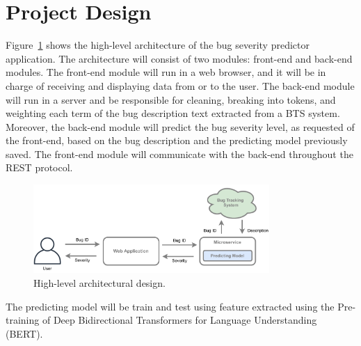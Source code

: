\documentclass[a4paper]{article}
\begin{document}
\section{Project Design}
Figure~\ref{fig:application-architecture} shows the high-level architecture of the bug severity predictor application. The architecture will consist of two modules: front-end and back-end modules. The front-end module will run in a web browser, and it will be in charge of receiving and displaying data from or to the user. The back-end module will run in a server and be responsible for cleaning, breaking into tokens, and weighting each term of the bug description text extracted from a BTS system. Moreover, the back-end module will predict the bug severity level, as requested of the front-end, based on the bug description and the predicting model previously saved. The front-end module will communicate with the back-end throughout the REST protocol. 
\begin{figure}[h!]
    \centering
    \includegraphics[width=0.8\textwidth]{udacity-capstone-project.pdf}
    \caption{High-level architectural design.}
    \label{fig:application-architecture}
\end{figure}

The predicting model will be train and test using feature extracted using the Pre-training of Deep Bidirectional Transformers for
Language Understanding (BERT)\cite{devlin:2019}.  

\printbibliography

\end{document}

